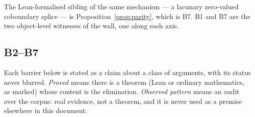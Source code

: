 \documentclass[11pt]{article}
\theoremstyle{breakplain}
\theoremstyle{breakdefinition}
\theoremstyle{breakdefinition}
\begin{document}
The Lean-formalised sibling of the same mechanism --- a lacunary zero-valued
coboundary splice --- is Proposition~\ref{prop:parity}, which is B7. B1 and B7
are the two object-level witnesses of the wall, one along each axis.

\subsection{B2--B7}

Each barrier below is stated as a claim about a class of arguments, with its
status never blurred. \emph{Proved} means there is a theorem (Lean or ordinary
mathematics, as marked) whose content is the elimination. \emph{Observed
pattern} means an audit over the corpus: real evidence, not a theorem, and it
is never used as a premise elsewhere in this document.
\end{document}
